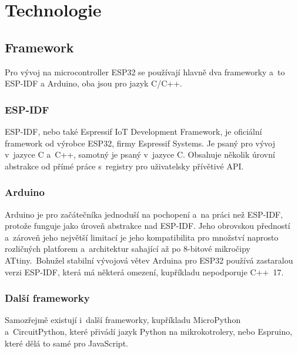 \chapter{Technologie}

\section{Framework}

Pro vývoj na microcontroller ESP32 se používají hlavně dva frameworky a~to ESP-IDF\cite{ESP-IDF} a Arduino\cite{arduino}, oba jsou pro jazyk C/C++.

\subsection{ESP-IDF}

ESP-IDF, nebo také Espressif IoT Development Framework, je oficiální framework od výrobce ESP32, firmy Espressif Systems\cite{espressif}.
Je psaný pro vývoj v~jazyce C a~C++, samotný je psaný v~jazyce C.
Obsahuje několik úrovní abstrakce od přímé práce s~registry pro uživatelsky přívětivé API.





\subsection{Arduino}

Arduino je pro začátečníka jednoduší na pochopení a~na práci než ESP-IDF, protože funguje jako úroveň abstrakce nad ESP-IDF.
Jeho obrovskou předností a~zároveň jeho největší limitací je jeho kompatibilita pro množství naprosto rozličných platforem a~architektur sahající až po 8-bitové mikročipy ATtiny.~Bohužel stabilní vývojová větev Arduina pro ESP32 používá zastaralou verzi ESP-IDF, která má některá omezení, kupříkladu nepodporuje C++~17.



\subsection{Další frameworky}

Samozřejmě existují i~další frameworky, kupříkladu MicroPython\cite{uPython} a~CircuitPython\cite{circuitPython}, které přivádí jazyk Python na mikrokotrolery, nebo Espruino\cite{espruino}, které dělá to samé pro JavaScript.

